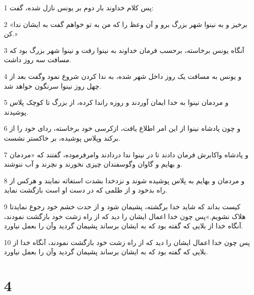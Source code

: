 \par 1 پس کلام خداوند بار دوم بر یونس نازل شده، گفت:
\par 2 «برخیز و به نینوا شهر بزرگ برو و آن وعظ را که من به تو خواهم گفت به ایشان ندا کن.»
\par 3 آنگاه یونس برخاسته، برحسب فرمان خداوند به نینوا رفت و نینوا شهر بزرگ بود که مسافت سه روز داشت.
\par 4 و یونس به مسافت یک روز داخل شهر شده، به ندا کردن شروع نمود وگفت بعد از چهل روز نینوا سرنگون خواهد شد.
\par 5 و مردمان نینوا به خدا ایمان آوردند و روزه راندا کرده، از بزرگ تا کوچک پلاس پوشیدند.
\par 6 و چون پادشاه نینوا از این امر اطلاع یافت، ازکرسی خود برخاسته، ردای خود را از برکند وپلاس پوشیده، بر خاکستر نشست.
\par 7 و پادشاه واکابرش فرمان دادند تا در نینوا ندا در‌دادند وامرفرموده، گفتند که «مردمان و بهایم و گاوان وگوسفندان چیزی نخورند و نچرند و آب ننوشند.
\par 8 و مردمان و بهایم به پلاس پوشیده شوند و نزدخدا بشدت استغاثه نمایند و هرکس از راه بدخود و از ظلمی که در دست او است بازگشت نماید.
\par 9 کیست بداند که شاید خدا برگشته، پشیمان شود و از حدت خشم خود رجوع نمایدتا هلاک نشویم.»پس چون خدا اعمال ایشان را دید که از راه زشت خود بازگشت نمودند، آنگاه خدا از بلایی که گفته بود که به ایشان برساند پشیمان گردید وآن را بعمل نیاورد.
\par 10 پس چون خدا اعمال ایشان را دید که از راه زشت خود بازگشت نمودند، آنگاه خدا از بلایی که گفته بود که به ایشان برساند پشیمان گردید وآن را بعمل نیاورد.

\chapter{4}

